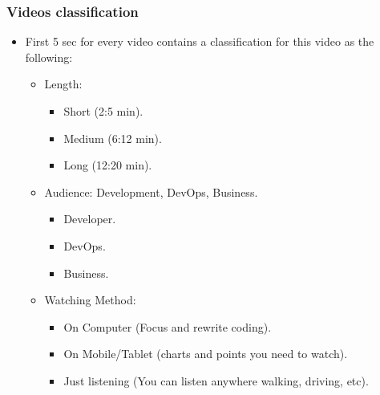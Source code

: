 \begin{frame}[c]
\begin{figure}[ht]
	\end{figure}
\end{frame}


\begin{frame}
	\frametitle{Videos classification}
	
	\begin{itemize}[<+->]
		\item First 5 sec for every video contains a classification for this video as the following:
		\begin{itemize}[<+->]
			\item Length: 
				\begin{itemize}[<+->]
						\item Short (2:5 min).
						\item Medium (6:12 min).
						\item Long (12:20 min).
				\end{itemize}
			\item Audience: Development, DevOps, Business.
				\begin{itemize}[<+->]
					\item Developer.
					\item DevOps.
					\item Business.
				\end{itemize}
			\item Watching Method:
				\begin{itemize}[<+->]
					\item On Computer (Focus and rewrite coding).
					\item On Mobile/Tablet (charts and points you need to watch).
					\item Just listening (You can listen anywhere walking, driving, etc).
				\end{itemize}
		\end{itemize}
	\end{itemize}
\end{frame}

